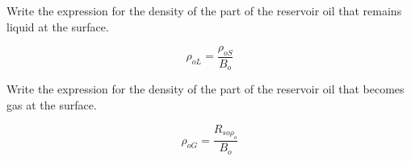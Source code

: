 \begin{question}
  Write the expression for the density of the part of the reservoir oil that remains liquid at the surface.
\end{question}

\begin{equation}
  \rho_{oL} = \frac{\rho_{oS}}{B_o}
\end{equation}

\begin{question}
  Write the expression for the density of the part of the reservoir oil that becomes gas at the surface.
\end{question}

\begin{equation}
  \rho_{oG} = \frac{R_{so \rho_o}}{B_o}
\end{equation}




